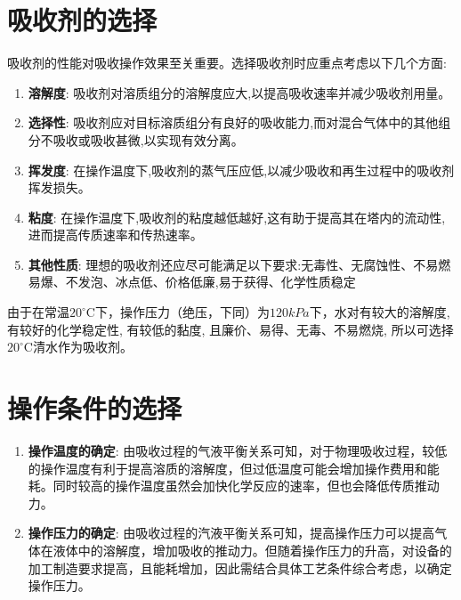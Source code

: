 \section{吸收剂的选择}

吸收剂的性能对吸收操作效果至关重要。选择吸收剂时应重点考虑以下几个方面:

\begin{enumerate}
	\item \textbf{溶解度}: 吸收剂对溶质组分的溶解度应大,以提高吸收速率并减少吸收剂用量。
	
	\item \textbf{选择性}: 吸收剂应对目标溶质组分有良好的吸收能力,而对混合气体中的其他组分不吸收或吸收甚微,以实现有效分离。
	
	\item \textbf{挥发度}: 在操作温度下,吸收剂的蒸气压应低,以减少吸收和再生过程中的吸收剂挥发损失。
	
	\item \textbf{粘度}: 在操作温度下,吸收剂的粘度越低越好,这有助于提高其在塔内的流动性,进而提高传质速率和传热速率。
	
	\item \textbf{其他性质}: 理想的吸收剂还应尽可能满足以下要求:无毒性、无腐蚀性、不易燃易爆、不发泡、冰点低、价格低廉,易于获得、化学性质稳定
\end{enumerate}

由于在常温$20^{\circ}$C下，操作压力（绝压，下同）为$120kPa$下，水对有较大的溶解度, 有较好的化学稳定性, 有较低的黏度, 且廉价、易得、无毒、不易燃烧, 所以可选择$20^{\circ}$C清水作为吸收剂。



\section{操作条件的选择}

\begin{enumerate}
	\item \textbf{操作温度的确定}: 由吸收过程的气液平衡关系可知，对于物理吸收过程，较低的操作温度有利于提高溶质的溶解度，但过低温度可能会增加操作费用和能耗。同时较高的操作温度虽然会加快化学反应的速率，但也会降低传质推动力。
	
	\item \textbf{操作压力的确定}: 由吸收过程的汽液平衡关系可知，提高操作压力可以提高气体在液体中的溶解度，增加吸收的推动力。但随着操作压力的升高，对设备的加工制造要求提高，且能耗增加，因此需结合具体工艺条件综合考虑，以确定操作压力。
\end{enumerate}

